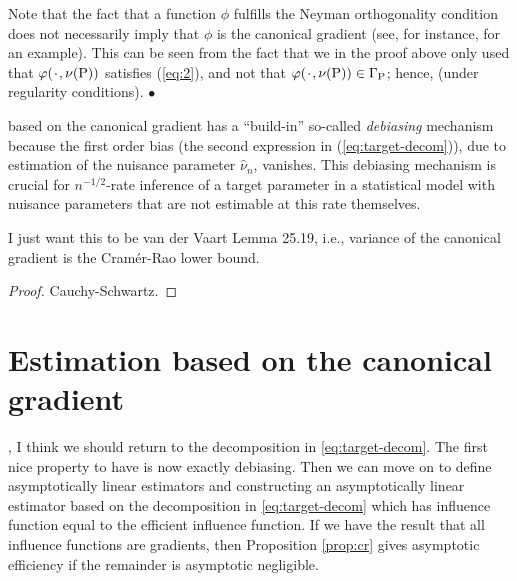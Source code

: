 \documentclass[a4,danish]{article}
\newcommand\xqed[1]{%
  \leavevmode\unskip\penalty9999 \hbox{}\nobreak\hfill
  \quad\hbox{#1}}
\newcommand\xend{\xqed{\(\bullet\)}}
\begin{document}
\begin{remark}
  Note that the fact that a function $\phi$ fulfills the Neyman
  orthogonality condition does not necessarily imply that $\phi$ is
  the canonical gradient (see, for instance,
  \cite{chernozhukov2016double} for an example). This can be seen from
  the fact that we in the proof above only used that
  $\phi(\blank, \nu(\P))$ satisfies (\ref{eq:2}), and not that
  $\phi(\blank, \nu(\P)) \in \Gamma_{\P}$; hence,  (under regularity
  conditions). \xend
\end{remark}

   based on the canonical gradient has a
``build-in'' so-called \textit{debiasing} mechanism because the first
order bias (the second expression in (\ref{eq:target-decom})), due to
estimation of the nuisance parameter $\hat{\nu}_n$, vanishes. This
debiasing mechanism is crucial for $n^{-1/2}$-rate inference of a
target parameter in a statistical model with nuisance parameters that
are not estimable at this rate themselves.  \\



\begin{proposition}
  I just want this to be van der Vaart Lemma 25.19, i.e., variance of
  the canonical gradient is the Cramér-Rao lower bound.
  \label{prop:cr}
\end{proposition}

\begin{proof}
  Cauchy-Schwartz.
\end{proof}
 


\section{Estimation based on the canonical gradient}
\label{sec:estim-inform-bounds}


, I think we should return
to the decomposition in \eqref{eq:target-decom}. The first nice
property to have is now exactly debiasing. Then we can move on to
define asymptotically linear estimators and constructing an
asymptotically linear estimator based on the decomposition in
\eqref{eq:target-decom} which has influence function equal to the
efficient influence function. If we have the result that all influence
functions are gradients, then Proposition \ref{prop:cr} gives
asymptotic efficiency if the remainder is asymptotic negligible.
\end{document}
